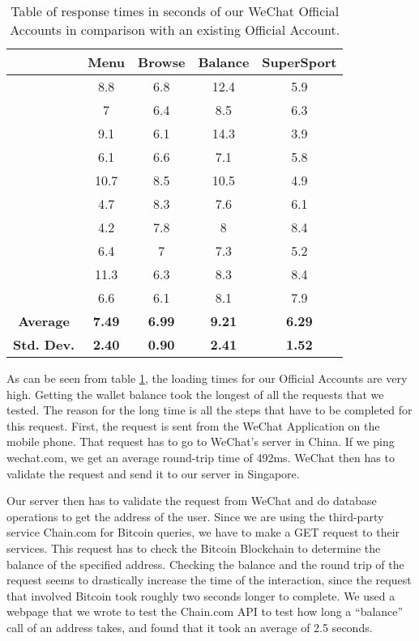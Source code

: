 \begin{table}
	\begin{center}
		\caption{Table of response times in seconds of our WeChat Official Accounts in comparison with an existing Official Account.} 
		\begin{tabular}	{ | c| c | c | c| c|}
		\hline
		 &\textbf{Menu} & \textbf{Browse} & \textbf{Balance} & \textbf{SuperSport}\\ \hline
		 	& 8.8 & 6.8 & 12.4 & 5.9 \\ \hline
			& 7 & 6.4 & 8.5 & 6.3 \\ \hline
			& 9.1 & 6.1 & 14.3 & 3.9 \\ \hline
			& 6.1 & 6.6 & 7.1 & 5.8 \\ \hline
			& 10.7 & 8.5 & 10.5 & 4.9 \\ \hline
			& 4.7 & 8.3 & 7.6 & 6.1 \\ \hline
			& 4.2 & 7.8 & 8 & 8.4 \\ \hline
			& 6.4 & 7 & 7.3 & 5.2 \\ \hline
			& 11.3 & 6.3 & 8.3 & 8.4 \\ \hline
			& 6.6 & 6.1 & 8.1 & 7.9 \\ \hline 
			\textbf{Average} & \textbf{7.49} & \textbf{6.99} &  \textbf{9.21} & \textbf{6.29}\\ \hline
			\textbf{Std. Dev.} & \textbf{2.40} & \textbf{0.90} & \textbf{2.41} & \textbf{1.52} \\ \hline
		
		
		\end{tabular}
		
		\label{tbl:loading_times}
	\end{center}
\end{table}

As can be seen from table \ref{tbl:loading_times}, the loading times for our Official Accounts are very high. Getting the wallet balance took the longest of all the requests that we tested. The reason for the long time is all the steps that have to be completed for this request. First, the request is sent from the WeChat Application on the mobile phone. That request has to go to WeChat's server in China. If we ping wechat.com, we get an average round-trip time of 492ms. WeChat then has to validate the request and send it to our server in Singapore. 

Our server then has to validate the request from WeChat and do database operations to get the address of the user. Since we are using the third-party service Chain.com for Bitcoin queries, we have to make a GET request to their services. This request has to check the Bitcoin Blockchain to determine the balance of the specified address. Checking the balance and the round trip of the request seems to drastically increase the time of the interaction, since the request that involved Bitcoin took roughly two seconds longer to complete. We used a webpage that we wrote to test the Chain.com API to test how long a ``balance'' call of an address takes, and found that it took an average of 2.5 seconds.


